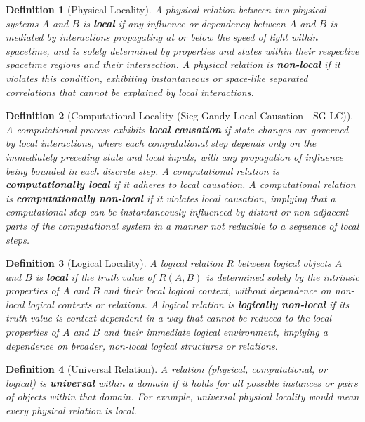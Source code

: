 \documentclass{article}
\newtheorem{definition}{Definition}
\begin{document}
	\begin{definition}[Physical Locality]
		A physical relation between two physical systems $A$ and $B$ is \textbf{local} if any influence or dependency between $A$ and $B$ is mediated by interactions propagating at or below the speed of light within spacetime, and is solely determined by properties and states within their respective spacetime regions and their intersection. A physical relation is \textbf{non-local} if it violates this condition, exhibiting instantaneous or space-like separated correlations that cannot be explained by local interactions.
	\end{definition}

	\begin{definition}[Computational Locality (Sieg-Gandy Local Causation - SG-LC)]
		A computational process exhibits \textbf{local causation} if state changes are governed by local interactions, where each computational step depends only on the immediately preceding state and local inputs, with any propagation of influence being bounded in each discrete step. A computational relation is \textbf{computationally local} if it adheres to local causation. A computational relation is \textbf{computationally non-local} if it violates local causation, implying that a computational step can be instantaneously influenced by distant or non-adjacent parts of the computational system in a manner not reducible to a sequence of local steps.
	\end{definition}

	\begin{definition}[Logical Locality]
		A logical relation $R$ between logical objects $A$ and $B$ is \textbf{local} if the truth value of $R(A, B)$ is determined solely by the intrinsic properties of $A$ and $B$ and their local logical context, without dependence on non-local logical contexts or relations. A logical relation is \textbf{logically non-local} if its truth value is context-dependent in a way that cannot be reduced to the local properties of $A$ and $B$ and their immediate logical environment, implying a dependence on broader, non-local logical structures or relations.
	\end{definition}

	\begin{definition}[Universal Relation]
		A relation (physical, computational, or logical) is \textbf{universal} within a domain if it holds for all possible instances or pairs of objects within that domain. For example, universal physical locality would mean every physical relation is local.
	\end{definition}
\end{document}
